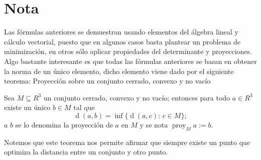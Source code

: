 \documentclass[11pt, a4paper]{article}
\DeclareMathOperator{\proy}{proy}
\DeclareMathOperator{\dd}{d}
\begin{document}
\section*{Nota}
Las fórmulas anteriores se demuestran usando elementos del álgebra lineal y cálculo vectorial, puesto que en algunos casos basta plantear un problema de minimización, en otros sólo aplicar propiedades del determinante y proyecciones. Algo bastante interesante es que todas las fórmulas anteriores se basan en obtener la norma de un único elemento, dicho elemento viene dado por el siguiente teorema:
Proyección sobre un conjunto cerrado, convexo y no vacío 

Sea \(M \subseteq R^3 \) un conjunto cerrado, convexo y no vacío; entonces para todo \(a\in R^3\) existe un único \(b\in M\) tal que \[\dd (a,b) = \inf\big\{ \dd(a,c): \, c \in M  \big\};\]\(a\) \(b\) se lo denomina la proyección de \(a\) en \(M\) y se nota \( \proy_M a := b\).

Notemos que este teorema nos permite afirmar que siempre existe un punto que optimiza la distancia entre un conjunto y otro punto.
\end{document}
